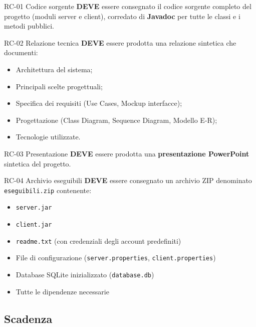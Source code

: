 \documentclass[12pt, a4paper]{article}
\newcommand{\mustshall}{\textbf{DEVE}}
\newcommand{\code}[1]{\texttt{#1}}
\begin{document}
\begin{reqbox}{RC-01 \quad Codice sorgente \quad [MUST]}
\mustshall{} essere consegnato il codice sorgente completo del progetto (moduli server e client), corredato di \textbf{Javadoc} per tutte le classi e i metodi pubblici.
\end{reqbox}

\begin{reqbox}{RC-02 \quad Relazione tecnica \quad [MUST]}
\mustshall{} essere prodotta una relazione sintetica che documenti:
\begin{itemize}
    \item Architettura del sistema;
    \item Principali scelte progettuali;
    \item Specifica dei requisiti (Use Cases, Mockup interfacce);
    \item Progettazione (Class Diagram, Sequence Diagram, Modello E-R);
    \item Tecnologie utilizzate.
\end{itemize}
\end{reqbox}

\begin{reqbox}{RC-03 \quad Presentazione \quad [MUST]}
\mustshall{} essere prodotta una \textbf{presentazione PowerPoint} sintetica del progetto.
\end{reqbox}

\begin{reqbox}{RC-04 \quad Archivio eseguibili \quad [MUST]}
\mustshall{} essere consegnato un archivio ZIP denominato \code{eseguibili.zip} contenente:
\begin{itemize}
    \item \code{server.jar}
    \item \code{client.jar}
    \item \code{readme.txt} (con credenziali degli account predefiniti)
    \item File di configurazione (\code{server.properties}, \code{client.properties})
    \item Database SQLite inizializzato (\code{database.db})
    \item Tutte le dipendenze necessarie
\end{itemize}
\end{reqbox}

\subsection{Scadenza}
\end{document}
